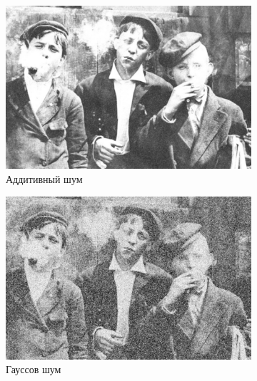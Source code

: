 \begin{figure}[ht]
\begin{subfigure}[b]{0.5\linewidth}
      \includegraphics[width=0.95\linewidth]{../Contraharmonic_Filter/Contraharmonic_Additive_noise_(m,n=(3,_3),q=0.85).jpg} 
      \caption{Аддитивный шум} 
      \label{contraharmonic_0.85:c} 
      \vspace{4ex}
    \end{subfigure}%
    \begin{subfigure}[b]{0.5\linewidth}
      \centering
      \includegraphics[width=0.95\linewidth]{../Contraharmonic_Filter/Contraharmonic_Gaussian_noise_(m,n=(3,_3),q=0.85).jpg} 
      \caption{Гауссов шум} 
      \label{contraharmonic_0.85:d} 
      \vspace{4ex}
    \end{subfigure}
    \begin{subfigure}[b]{0.5\linewidth}
      \centering

\end{subfigure}
\end{figure}
